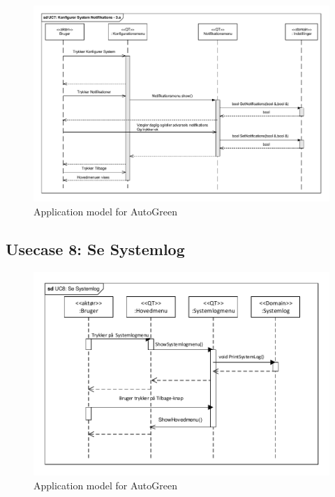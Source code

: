 \begin{figure}[!h]
\centering 
\includegraphics[width={\textwidth-1cm}, trim=0 0 0 0, clip=true] {../fig/SD_autoGreen_UC_7_Notifikationer.pdf}
\caption{Application model for AutoGreen}
\label{fig:SD_UC7_alt3}
\end{figure}

\clearpage

\subsection{Usecase 8: Se Systemlog}

\begin{figure}[!h]
\centering 
\includegraphics[width={\textwidth-1cm}, trim=0 0 0 0, clip=true] {../fig/SD_autogreen_UC_8_Se_Systemlog.pdf}
\caption{Application model for AutoGreen}
\label{fig:SD_UC8}
\end{figure}

